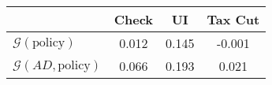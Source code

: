 \begin{tabular}{@{}lccc@{}} 
\toprule 
                          & Check      & UI    & Tax Cut    \\  \midrule 
$\mathcal{G}(\text{policy})$ & 0.012  & 0.145  & -0.001     \\ 
$\mathcal{G}(AD,\text{policy})$ & 0.066  & 0.193  & 0.021     \\ 
\end{tabular}  
